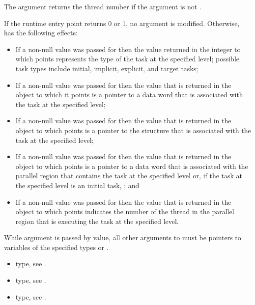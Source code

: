The  argument returns the thread number
if the argument is not .

\effect
If the runtime entry point returns 0 or 1, no argument is modified.
Otherwise,  has the following effects:

\begin{itemize}
\item If a non-null value was passed for  then the value 
      returned in the integer to which  points represents 
      the type of the task at the specified level; possible task types 
      include initial, implicit, explicit, and target tasks;
\item If a non-null value was passed for  then the value that
      is returned in the object to which it points is a pointer to a data word
      that is associated with the task at the specified level;
\item If a non-null value was passed for  then the value that
      is returned in the object to which  points is a pointer 
      to the  structure that is associated with the task at 
      the specified level;
\item If a non-null value was passed for  then the value that
      is returned in the object to which  points is a pointer 
      to a data word that is associated with the parallel region that contains 
      the task at the specified level or, if the task at the specified level is 
      an initial task, ; and
\item If a non-null value was passed for  then the value that 
      is returned in the object to which  points indicates the 
      number of the thread in the parallel region that is executing the task
      at the specified level.
\end{itemize}

\constraints
While argument  is passed by value, all other arguments to 
 must be pointers to variables of the specified types 
or .

\crossreferences
\begin{itemize}
\item {} type, see .

\item {} type, see .

\item {} type, see .
\end{itemize}



